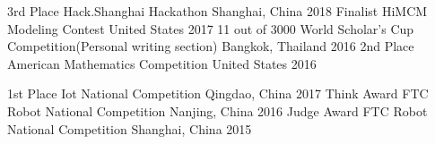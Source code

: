 \begin{cvhonors}
   \cvhonor
    {3rd Place}
    {Hack.Shanghai Hackathon}
    {Shanghai, China}
    {2018}
  \cvhonor
    {Finalist}
    {HiMCM Modeling Contest}
    {United States}
    {2017}
  \cvhonor
    {11 out of 3000}
    {World Scholar’s Cup Competition(Personal writing section)}
    {Bangkok, Thailand}
    {2016}
  \cvhonor
    {2nd Place}
    {American Mathematics Competition}
    {United States}
    {2016}
\end{cvhonors}
  
\begin{cvhonors}
   \cvhonor
    {1st Place}
    {Iot National Competition}
    {Qingdao, China}
    {2017}
  \cvhonor
    {Think Award}
    {FTC Robot National Competition}
    {Nanjing, China}
    {2016}
  \cvhonor
    {Judge Award}
    {FTC Robot National Competition}
    {Shanghai, China}
    {2015}
\end{cvhonors}
